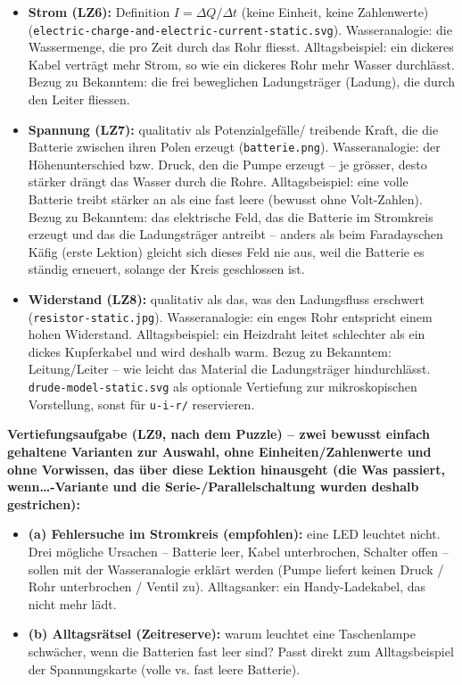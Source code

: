 \documentclass[11pt,a4paper]{article}
\begin{document}
\begin{itemize}[leftmargin=1.2cm,itemsep=0.5em]
  \item \textbf{Strom (LZ6):} Definition $I=\Delta Q/\Delta t$ (keine
  Einheit, keine Zahlenwerte) (\texttt{electric-charge-and-electric-current-static.svg}).
  Wasseranalogie: die Wassermenge, die pro Zeit durch das Rohr fliesst.
  Alltagsbeispiel: ein dickeres Kabel \glqq verträgt\grqq{} mehr Strom,
  so wie ein dickeres Rohr mehr Wasser durchlässt. Bezug zu Bekanntem:
  die frei beweglichen Ladungsträger (Ladung), die durch den Leiter
  fliessen.
  \item \textbf{Spannung (LZ7):} qualitativ als Potenzialgefälle/
  treibende Kraft, die die Batterie zwischen ihren Polen erzeugt
  (\texttt{batterie.png}). Wasseranalogie: der Höhenunterschied bzw.
  Druck, den die Pumpe erzeugt -- je grösser, desto stärker \glqq
  drängt\grqq{} das Wasser durch die Rohre. Alltagsbeispiel: eine volle
  Batterie treibt stärker an als eine fast leere (bewusst ohne
  Volt-Zahlen). Bezug zu Bekanntem: das elektrische Feld, das die
  Batterie im Stromkreis erzeugt und das die Ladungsträger antreibt --
  anders als beim Faradayschen Käfig (erste Lektion) gleicht sich
  dieses Feld nie aus, weil die Batterie es ständig erneuert, solange
  der Kreis geschlossen ist.
  \item \textbf{Widerstand (LZ8):} qualitativ als das, was den
  Ladungsfluss erschwert (\texttt{resistor-static.jpg}). Wasseranalogie:
  ein enges Rohr entspricht einem hohen Widerstand. Alltagsbeispiel: ein
  Heizdraht leitet schlechter als ein dickes Kupferkabel und wird
  deshalb warm. Bezug zu Bekanntem: Leitung/Leiter -- wie leicht das
  Material die Ladungsträger hindurchlässt.
  \texttt{drude-model-static.svg} als optionale Vertiefung zur
  mikroskopischen Vorstellung, sonst für \texttt{u-i-r/} reservieren.
\end{itemize}

\textbf{Vertiefungsaufgabe (LZ9, nach dem Puzzle) -- zwei bewusst
einfach gehaltene Varianten zur Auswahl, ohne Einheiten/Zahlenwerte und
ohne Vorwissen, das über diese Lektion hinausgeht (die
\glqq Was passiert, wenn\ldots{}\grqq{}-Variante und die
Serie-/Parallelschaltung wurden deshalb gestrichen):}

\begin{itemize}[leftmargin=1.2cm,itemsep=0.4em]
  \item \textbf{(a) Fehlersuche im Stromkreis (empfohlen):} eine LED
  leuchtet nicht. Drei mögliche Ursachen -- Batterie leer, Kabel
  unterbrochen, Schalter offen -- sollen mit der Wasseranalogie erklärt
  werden (Pumpe liefert keinen Druck / Rohr unterbrochen / Ventil zu).
  Alltagsanker: ein Handy-Ladekabel, das nicht mehr lädt.
  \item \textbf{(b) Alltagsrätsel (Zeitreserve):} warum leuchtet eine
  Taschenlampe schwächer, wenn die Batterien fast leer sind? Passt
  direkt zum Alltagsbeispiel der Spannungskarte (volle vs. fast leere
  Batterie).
\end{itemize}
\end{document}
